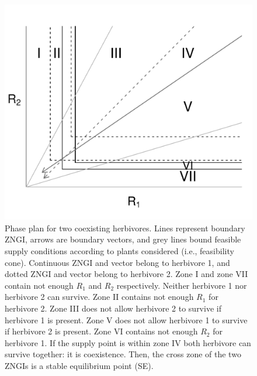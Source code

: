 \documentclass[12pt]{article}
\begin{document}
\begin{figure}[h]
\includegraphics[width=15 cm, keepaspectratio]{Coexistence}
\caption{Phase plan for two coexisting herbivores. Lines represent boundary ZNGI, arrows are boundary vectors, and grey lines bound feasible supply conditions according to plants considered (i.e., feasibility cone). Continuous ZNGI and vector belong to herbivore 1, and dotted ZNGI and vector belong to herbivore 2. Zone I and zone VII contain not enough $R_1$ and $R_2$ respectively. Neither herbivore 1 nor herbivore 2 can survive. Zone II contains not enough $R_1$ for herbivore 2. Zone III does not allow herbivore 2 to survive if herbivore 1 is present. Zone V does not allow herbivore 1 to survive if herbivore 2 is present. Zone VI contains not enough $R_2$ for herbivore 1. If the supply point is within zone IV both herbivore can survive together: it is coexistence. Then, the cross zone of the two ZNGIs is a stable equilibrium point (SE).
}
\label{Coexistence}
\end{figure}
\end{document}
